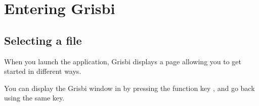 
\chapter{Entering Grisbi\label{entrance}}%

\section{Selecting a file\label{select-file}}%


When you launch the application, Grisbi displays a page allowing you to get started in different ways.%


You can display the Grisbi window in  by pressing the function key , and go back using the same key.%


